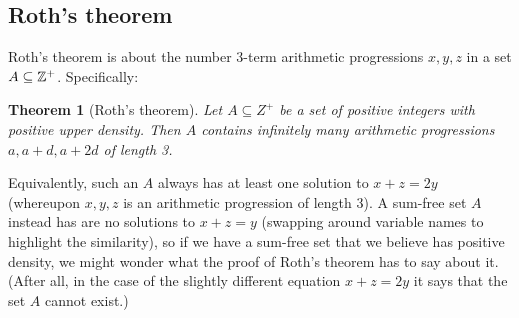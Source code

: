 \documentclass{article}
\newtheorem{theorem}{Theorem}[section]
\theoremstyle{definition}
\theoremstyle{remark}
\numberwithin{equation}{section}
\begin{document}










\subsection{Roth's theorem}

Roth's theorem is about the number 3-term arithmetic progressions
$x, y, z$ in a set $A \subseteq \mathbb{Z}^+$.  Specifically: 


\begin{theorem}[Roth's theorem]
  Let $A \subseteq Z^+$ be a set of positive integers with positive
  upper density.  Then $A$ contains infinitely many arithmetic
  progressions $a, a+d, a+2d$ of length 3.  
\end{theorem}

Equivalently, such an $A$ always has at least one solution to $x+z=2y$
(whereupon $x, y, z$ is an arithmetic progression of length $3$).  A
sum-free set $A$ instead has are no solutions to $x+z=y$ (swapping
around variable names to highlight the similarity), so if we have a
sum-free set that we believe has positive density, we might wonder
what the proof of Roth's theorem has to say about it.  (After all, in
the case of the slightly different equation $x+z=2y$ it says that the
set $A$ cannot exist.)
\end{document}
